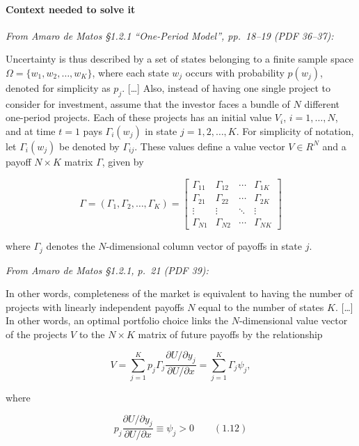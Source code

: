 \documentclass[11pt,a4paper]{article}
\numberwithin{equation}{section}
\begin{document}
\paragraph{Context needed to solve it}

\emph{From Amaro de Matos §1.2.1 ``One-Period Model'', pp.~18--19 (PDF 36--37):}

Uncertainty is thus described by a set of states belonging to a finite sample space
\(\Omega = \{w_1, w_2, \dots, w_K\}\), where each state \(w_j\) occurs with probability \(p(w_j)\),
denoted for simplicity as \(p_j\). {[}\ldots{]} Also, instead of having one single project to
consider for investment, assume that the investor faces a bundle of \(N\) different one-period
projects. Each of these projects has an initial value \(V_i\), \(i = 1, \dots, N\), and at time
\(t = 1\) pays \(\Gamma_i(w_j)\) in state \(j = 1, 2, \dots, K\). For simplicity of notation, let
\(\Gamma_i(w_j)\) be denoted by \(\Gamma_{ij}\). These values define a value vector \(V \in R^N\)
and a payoff \(N \times K\) matrix \(\Gamma\), given by

\[\Gamma = (\Gamma_1, \Gamma_2, \dots, \Gamma_K) = \begin{bmatrix} \Gamma_{11} & \Gamma_{12} & \cdots & \Gamma_{1K} \\ \Gamma_{21} & \Gamma_{22} & \cdots & \Gamma_{2K} \\ \vdots & \vdots & \ddots & \vdots \\ \Gamma_{N1} & \Gamma_{N2} & \cdots & \Gamma_{NK} \end{bmatrix}\]

where \(\Gamma_j\) denotes the \(N\)-dimensional column vector of payoffs in state \(j\).

\emph{From Amaro de Matos §1.2.1, p.~21 (PDF 39):}

In other words, completeness of the market is equivalent to having the number of projects with
linearly independent payoffs \(N\) equal to the number of states \(K\). {[}\ldots{]} In other words,
an optimal portfolio choice links the \(N\)-dimensional value vector of the projects \(V\) to the
\(N \times K\) matrix of future payoffs by the relationship

\[V = \sum_{j=1}^{K} p_j \Gamma_j \frac{\partial U/\partial y_j}{\partial U/\partial x} = \sum_{j=1}^{K} \Gamma_j \psi_j,\]

where

\[p_j \frac{\partial U/\partial y_j}{\partial U/\partial x} \equiv \psi_j > 0 \qquad (1.12)\]
\end{document}

